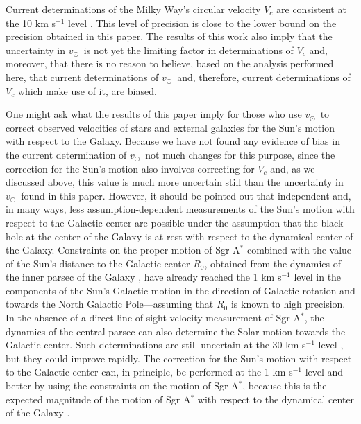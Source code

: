 \documentclass[12pt,preprint]{aastex}
\newcommand{\eg}{e.g.}
\newcommand{\vsunlsr}{\ensuremath{v_\odot}}
\newcommand{\vcirc}{\ensuremath{V_c}}
\begin{document}
Current determinations of the Milky Way's circular velocity $\vcirc$
are consistent at the 10 km s$^{-1}$ level \citep{Bovy09c}. This level
of precision is close to the lower bound on the precision obtained in
this paper. The results of this work also imply that the uncertainty
in \vsunlsr\ is not yet the limiting factor in determinations of
$\vcirc$ and, moreover, that there is no reason to believe, based on
the analysis performed here, that current determinations of \vsunlsr\
and, therefore, current determinations of $\vcirc$ which make use of
it, are biased.

One might ask what the results of this paper imply for those who use
\vsunlsr\ to correct observed velocities of stars and external
galaxies for the Sun's motion with respect to the Galaxy. Because we
have not found any evidence of bias in the current determination of
\vsunlsr\ not much changes for this purpose, since the correction for
the Sun's motion also involves correcting for $\vcirc$ and, as we
discussed above, this value is much more uncertain still than the
uncertainty in \vsunlsr\ found in this paper. However, it should be
pointed out that independent and, in many ways, less
assumption-dependent measurements of the Sun's motion with respect to
the Galactic center are possible under the assumption that the black
hole at the center of the Galaxy is at rest with respect to the
dynamical center of the Galaxy. Constraints on the proper motion of
Sgr A$^*$ \citep{Reid04a} combined with the value of the Sun's
distance to the Galactic center $R_0$, obtained from the dynamics of
the inner parsec of the Galaxy \citep{Ghez08a,Gillessen09a}, have
already reached the 1 km s$^{-1}$ level in the components of the Sun's
Galactic motion in the direction of Galactic rotation and towards the
North Galactic Pole---assuming that $R_0$ is known to high
precision. In the absence of a direct line-of-sight velocity
measurement of Sgr A$^*$, the dynamics of the central parsec can also
determine the Solar motion towards the Galactic center. Such
determinations are still uncertain at the 30 km s$^{-1}$ level
\citep{Ghez08a,Gillessen09a}, but they could improve rapidly. The
correction for the Sun's motion with respect to the Galactic center
can, in principle, be performed at the 1 km s$^{-1}$ level and better
by using the constraints on the motion of Sgr A$^*$, because this is
the expected magnitude of the motion of Sgr A$^*$ with respect to the
dynamical center of the Galaxy \citep[\eg,][]{Dorband03a,Reid04a}.
\end{document}
